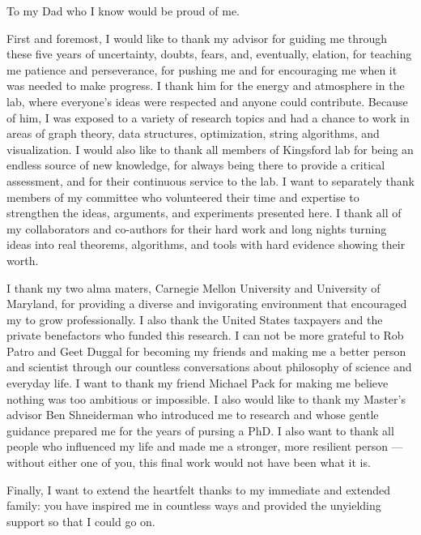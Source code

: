 \documentclass[12pt]{cmuthesis}
\begin{document}
\begin{dedication}
To my Dad who I know would be proud of me.
\end{dedication}


\begin{acknowledgments}
First and foremost, I would like to thank my advisor for guiding me through these five years of uncertainty, doubts, fears, and, eventually, elation, for teaching me patience and perseverance, for pushing me and for encouraging me when it was needed to make progress. I thank him for the energy and atmosphere in the lab, where everyone's ideas were respected and anyone could contribute. Because of him, I was exposed to a variety of research topics and had a chance to work in areas of graph theory, data structures, optimization, string algorithms, and visualization. I would also like to thank all members of Kingsford lab for being an endless source of new knowledge, for always being there to provide a critical assessment, and for their continuous service to the lab. I want to separately thank members of my committee who volunteered their time and expertise to strengthen the ideas, arguments, and experiments presented here. I thank all of my collaborators and co-authors for their hard work and long nights turning ideas into real theorems, algorithms, and tools with hard evidence showing their worth.

I thank my two alma maters, Carnegie Mellon University and University of Maryland, for providing a diverse and invigorating environment that encouraged my to grow professionally. I also thank the United States taxpayers and the private benefactors who funded this research. I can not be more grateful to Rob Patro and Geet Duggal for becoming my friends and making me a better person and scientist through our countless conversations about philosophy of science and everyday life. I want to thank my friend Michael Pack for making me believe nothing was too ambitious or impossible. I also would like to thank my Master's advisor Ben Shneiderman who introduced me to research and whose gentle guidance prepared me for the years of pursing a PhD. I also want to thank all people who influenced my life and made me a stronger, more resilient person --- without either one of you, this final work would not have been what it is.

Finally, I want to extend the heartfelt thanks to my immediate and extended family: you have  inspired me in countless ways and provided the unyielding support so that I could go on.
\end{acknowledgments}
\end{document}
